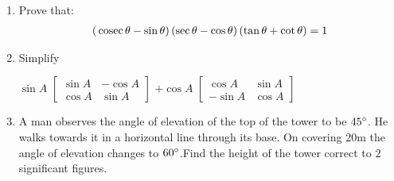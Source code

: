 \begin{enumerate}
\item Prove that:
\begin{align}
	\left(\,\text{cosec}\,\theta-\sin\theta\right)\left(\sec\theta-\cos\theta\right)\left(\tan\theta+\cot\theta\right)=1
\end{align}
\item Simplify
	\begin{center}
	        $\sin{A}$
		$\begin{bmatrix}
			\sin{A} & -\cos{A} \\
			\cos{A} &  \sin{A}
		 \end{bmatrix}$	
                  $+\cos{A}$
		  $\begin{bmatrix}
			\cos{A} & \sin{A} \\
		       -\sin{A} & \cos{A}
		  \end{bmatrix}$	  
	\end{center} 
\item A man observes the angle of elevation of the top of the tower to be $45\degree$. He walks towards it in a horizontal line through its base. On covering $20\mathrm{m}$ the angle of elevation changes to $60\degree$.Find the height of the tower correct to $2$ significant figures.
\end{enumerate}

